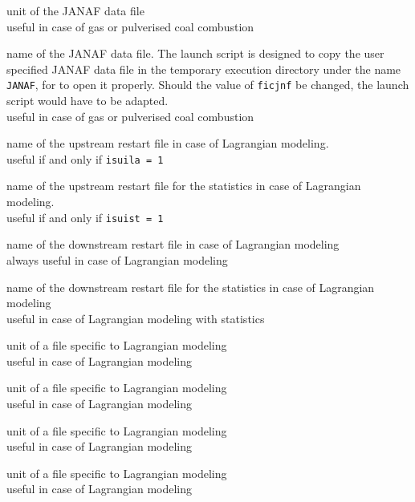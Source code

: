 {unit of the JANAF data file\\
useful in case of gas or pulverised coal combustion}

{name of the JANAF data file. The launch script is designed to copy the
user specified JANAF data file in the temporary execution directory
under the name \texttt{JANAF}, for \CS to open it properly. Should the value
of {\tt ficjnf} be changed, the launch script would have to be adapted.\\
useful in case of gas or pulverised coal combustion}


{name of the upstream restart file in case of Lagrangian modeling.\\
useful if and only if {\tt isuila = 1}}

{name of the upstream restart file for the statistics in case of
Lagrangian modeling.\\
useful if and only if {\tt isuist = 1}}

{name of the downstream restart file in case of Lagrangian modeling\\
always useful in case of Lagrangian modeling}

{name of the downstream restart file for the statistics in case of
Lagrangian modeling\\
useful in case of Lagrangian modeling with statistics}

{unit of a file specific to Lagrangian modeling\\
useful in case of Lagrangian modeling}

{unit of a file specific to Lagrangian modeling\\
useful in case of Lagrangian modeling}

{unit of a file specific to Lagrangian modeling\\
useful in case of Lagrangian modeling}

{unit of a file specific to Lagrangian modeling\\
useful in case of Lagrangian modeling}

